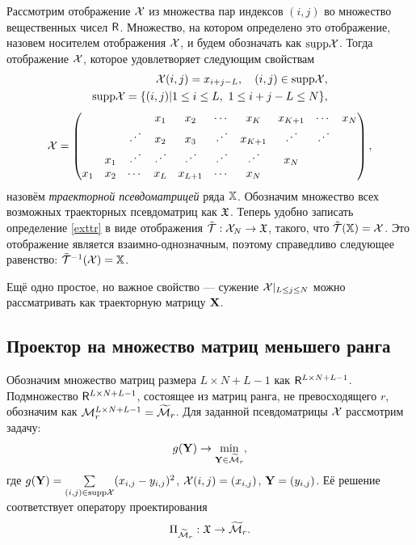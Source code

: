 \documentclass[12pt,a4paper,fleqn,leqno]{article}
\begin{document}
Рассмотрим отображение $\mathcal{X}$ из множества пар индексов $(i,j)$ во множество вещественных чисел $\mathsf{R}$. Множество, на котором определено это отображение, назовем носителем отображения $\mathcal{X}$, и будем обозначать как $\text{supp} \mathcal{X}$. Тогда отображение $\mathcal{X}$, которое удовлетворяет следующим свойствам
\begin{equation} \label{exttr}
\begin{aligned}
\mathcal{X}(i, j) = x_{i+j-L}, \quad (i,j) \in \text{supp} \mathcal{X}, \\ \text{supp} \mathcal{X} = \{(i,j) | 1 \le i \le L,\ 1 \le i+j-L \le N\},
\end{aligned}
\end{equation}
\begin{equation*}
    \mathcal{X} = \begin{pmatrix}
     &  &  & x_1 & x_2 & \cdots & x_K & x_{K+1} & \cdots & x_N \\
     &  & \iddots & x_2 & x_3 & \iddots & x_{K+1} & \iddots & \iddots &  \\
     & x_1 & \iddots & \iddots & \iddots & \iddots & \iddots & x_N &  &  \\
    x_1 & x_2 & \cdots & x_L & x_{L+1} & \cdots & x_N &  &  &
    \end{pmatrix},
\end{equation*}
назовём \emph{траекторной псевдоматрицей} ряда $\mathbb{X}$. Обозначим множество всех возможных траекторных псевдоматриц как $\mathfrak{X}$. Теперь удобно записать определение \eqref{exttr} в виде отображения $\tilde {\mathcal{T}}: \mathcal{X}_N \rightarrow \mathfrak{X}$, такого, что $\tilde {\mathcal{T}}(\mathbb{X}) = \mathcal{X}$. Это отображение является взаимно-однозначным, поэтому справедливо следующее равенство: $\tilde{\mathcal{T}}^{-1}(\mathcal{X}) = \mathbb{X}$.

Ещё одно простое, но важное свойство --- сужение $\mathcal{X} |_{L \le j \le N}$ можно рассматривать как траекторную матрицу $\mathbf{X}$.

\subsection{Проектор на множество матриц меньшего ранга}
Обозначим множество матриц размера $L \times N + L - 1$ как $\mathsf{R}^{L \times N + L - 1}$. Подмножество $\mathsf{R}^{L \times N + L - 1}$, состоящее из матриц ранга, не превосходящего $r$, обозначим как $\mathcal{M}_r^{L \times N + L - 1} = \widetilde {\mathcal{M}}_r$. Для заданной псевдоматрицы $\mathcal{X}$ рассмотрим задачу:
\begin{equation*}
g(\mathbf{Y}) \to \min_{\mathbf{Y} \in \widetilde {\mathcal{M}}_r},
\end{equation*}
где $g(\mathbf{Y}) = \sum \limits_{(i,j) \in \text{supp} \mathcal{X}} (x_{i,j}-y_{i,j})^2$, $\mathcal{X}(i, j) = (x_{i,j})$, $\mathbf{Y} = (y_{i,j})$.
Её решение соответствует оператору проектирования
\begin{equation}\label{pi_widetilde}
\Pi_{\widetilde {\mathcal{M}}_r} : \mathfrak{X} \to \widetilde{\mathcal{M}}_r.
\end{equation}
\end{document}
